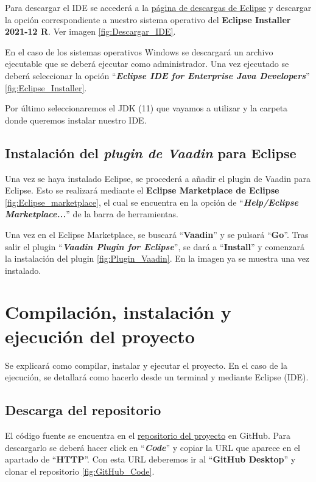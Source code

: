 Para descargar el IDE se accederá a la \href{https://www.eclipse.org/downloads/packages/release/2021-12/r}{página de descargas de Eclipse} y descargar la opción correspondiente a nuestro sistema operativo del \textbf{Eclipse Installer 2021-12 R}. Ver imagen \ref{fig:Descargar_IDE}.


En el caso de los sistemas operativos Windows se descargará un archivo ejecutable que se deberá ejecutar como administrador. Una vez ejecutado se deberá seleccionar la opción ``\textbf{\textit{Eclipse IDE for Enterprise Java Developers}}'' \ref{fig:Eclipse_Installer}. 



Por último seleccionaremos el JDK (11) que vayamos a utilizar y la carpeta donde queremos instalar nuestro IDE.

\subsection{Instalación del \textit{plugin de Vaadin} para Eclipse}
Una vez se haya instalado Eclipse, se procederá a añadir el plugin de Vaadin para Eclipse. Esto se realizará mediante el \textbf{Eclipse Marketplace de Eclipse} \ref{fig:Eclipse_marketplace}, el cual se encuentra en la opción de ``\textbf{\textit{Help/Eclipse Marketplace...}}'' de la barra de herramientas.


Una vez en el Eclipse Marketplace, se buscará ``\textbf{Vaadin}'' y se pulsará ``\textbf{Go}''. Tras salir el plugin ``\textbf{\textit{Vaadin Plugin for Eclipse}}'', se dará a ``\textbf{Install}'' y comenzará la instalación del plugin \ref{fig:Plugin_Vaadin}. En la imagen ya se muestra una vez instalado.


\section{Compilación, instalación y ejecución del proyecto}

Se explicará como compilar, instalar y ejecutar el proyecto. En el caso de
la ejecución, se detallará como hacerlo desde un terminal y mediante Eclipse (IDE).

\subsection{Descarga del repositorio}
El código fuente se encuentra en el \href{https://github.com/drg1006/Gestor-TFG-2022.git}{repositorio del proyecto} en GitHub. Para descargarlo se deberá hacer click en ``\textbf{\textit{Code}}'' y copiar la URL que aparece en el apartado de ``\textbf{HTTP}''. Con esta URL deberemos ir al ``\textbf{GitHub Desktop}'' y clonar el repositorio \ref{fig:GitHub_Code}.

